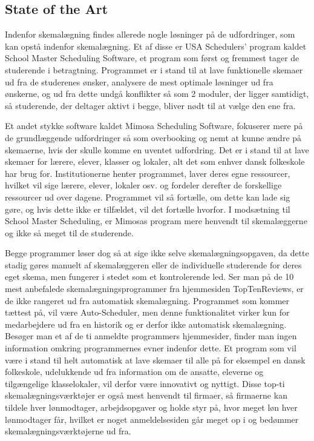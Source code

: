 \subsection{State of the Art}
\label{sota}
Indenfor skemalægning findes allerede nogle løsninger på de udfordringer, som kan opstå indenfor skemalægning. Et af disse er USA Schedulers' program kaldet School Master Scheduling Software\cite{USAS}, et program som først og fremmest tager de studerende i betragtning. Programmet er i stand til at lave funktionelle skemaer ud fra de studerenes ønsker, analysere de mest optimale løsninger ud fra ønskerne, og ud fra dette undgå konflikter så som 2 moduler, der ligger samtidigt, så studerende, der deltager aktivt i begge, bliver nødt til at vælge den ene fra.

Et andet stykke software kaldet Mimosa Scheduling Software\cite{Mimosa}, fokuserer mere på de grundlæggende udfordringer så som overbooking og nemt at kunne ændre på skemaerne, hvis der skulle komme en uventet udfordring. Det er i stand til at lave skemaer for lærere, elever, klasser og lokaler, alt det som enhver dansk folkeskole har brug for. Institutionerne henter programmet, laver deres egne ressourcer, hvilket vil sige lærere, elever, lokaler osv. og fordeler derefter de forskellige ressourcer ud over dagene. Programmet vil så fortælle, om dette kan lade sig gøre, og hvis dette ikke er tilfældet, vil det fortælle hvorfor\cite{MimosaTutorial}. I modsætning til School Master Scheduling, er Mimosas program mere henvendt til skemalæggerne og ikke så meget til de studerende. 

Begge programmer løser dog så at sige ikke selve skemalægningsopgaven, da dette stadig gøres manuelt af skemalæggeren eller de individuelle studerende for deres eget skema, men fungerer i stedet som et kontrolerende led. Ser man på de 10 mest anbefalede skemalægningsprogrammer fra hjemmesiden TopTenReviews\cite{top10Schedulers}, er de ikke rangeret ud fra automatisk skemalægning. Programmet som kommer tættest på, vil være Auto-Scheduler, men denne funktionalitet virker kun for medarbejdere ud fra en historik og er derfor ikke automatisk skemalægning. Besøger man et af de ti anmeldte programmers hjemmesider, finder man ingen information omkring programmernes evner indenfor dette. Et program som vil være i stand til helt automatisk at lave skemaer til alle på for eksempel en dansk folkeskole, udelukkende ud fra information om de ansatte, eleverne og tilgængelige klasselokaler, vil derfor være innovativt og nyttigt. Disse top-ti skemalægningsværktøjer er også mest henvendt til firmaer, så firmaerne kan tildele hver lønmodtager, arbejdsopgaver og holde styr på, hvor meget løn hver lønmodtager får, hvilket er noget anmeldelsesiden går meget op i og bedømmer skemalægningsværktøjerne ud fra.

